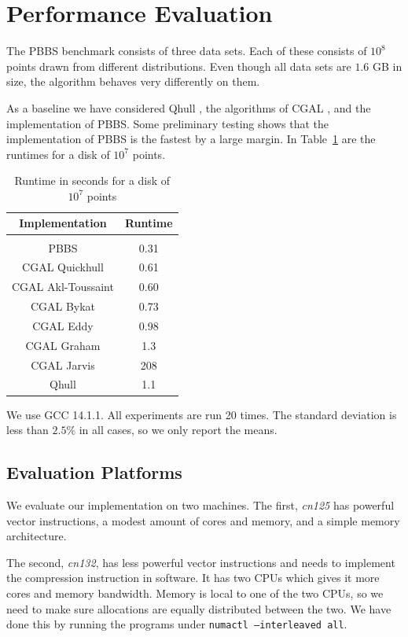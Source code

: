 \section{Performance Evaluation}\label{sec:perf}

The PBBS benchmark consists of three data sets. Each of these consists of
$10^8$ points drawn from different distributions. Even though all data sets
are $1.6$ GB in size, the algorithm behaves very differently on them.

As a baseline we have considered Qhull \cite{}, the algorithms of CGAL \cite{},
and the implementation of PBBS. Some preliminary testing shows that the
implementation of PBBS is the fastest by a large margin. In
Table~\ref{table:reference} are the runtimes for a disk of $10^7$ points.

\begin{table}[ht]
    \caption{Runtime in seconds for a disk of $10^7$ points}
    \label{table:reference}
    \begin{tabular}{c | c }
     Implementation & Runtime \\ 
     \hline \\
     PBBS & 0.31 \\  
     CGAL Quickhull & 0.61 \\
     CGAL Akl-Toussaint & 0.60 \\
     CGAL Bykat & 0.73 \\
     CGAL Eddy & 0.98 \\
     CGAL Graham & 1.3 \\
     CGAL Jarvis & 208 \\
     Qhull & 1.1 \\
    \end{tabular}
\end{table}

We use GCC 14.1.1. All experiments are run 20 times. The standard deviation is 
less than $2.5\%$ in all cases, so we only report the means.

\subsection{Evaluation Platforms}

We evaluate our implementation on two machines. The first, \textit{cn125}
has powerful vector instructions, a modest amount of cores and memory, and a 
simple memory architecture. 

The second, \textit{cn132}, has less powerful vector instructions and needs
to implement the compression instruction in software. It has two CPUs which
gives it more cores and memory bandwidth. Memory is local to one of the two
CPUs, so we need to make sure allocations are equally distributed between the
two. We have done this by running the programs under
\texttt{numactl --interleaved all}.

